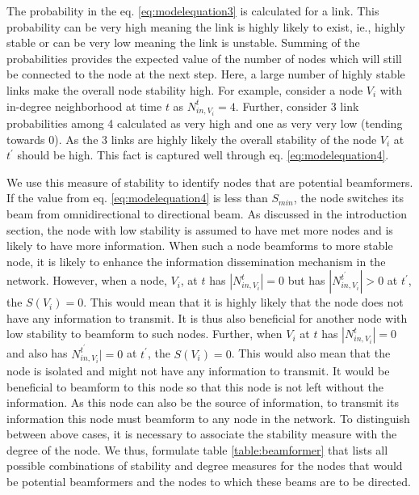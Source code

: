 \documentclass[preprint, twocolumn,5p]{elsarticle}
\begin{document}
The probability in the eq. \ref{eq:modelequation3} is calculated for a link. This probability can be very high meaning the link is highly likely to exist, ie., highly stable or can be very low meaning the link is unstable. Summing of the probabilities provides the expected value of the number of nodes which will still be connected to the node at the next step. Here, a large number of highly stable links make the overall node stability high. For example, consider a node $V_{i}$ with in-degree neighborhood at time $t$ as $N_{in,V_{i}}^{t}=4$. Further, consider 3 link probabilities among 4 calculated as very high and one as very very low (tending towards 0). As the 3 links are highly likely the overall stability of the node $V_{i}$ at $t^{'}$ should be high. This fact is captured well through eq. \ref{eq:modelequation4}.

We use this measure of stability to identify nodes that are potential beamformers. If the value from eq. \ref{eq:modelequation4} is less than $S_{min}$, the node switches its beam from omnidirectional to directional beam. As discussed in the introduction section, the node with low stability is assumed to have met more nodes and is likely to have more information. When such a node beamforms to more stable node, it is likely to enhance the information dissemination mechanism in the network. However, when a node, $V_{i}$, at $t$ has $|N_{in,V_{i}}^{t}|=0$ but has $|N_{in,V_{i}}^{t^{'}}|>0$ at $t^{'}$, the $S(V_{i})=0$. This would mean that it is highly likely that the node does not have any information to transmit. It is thus also beneficial for another node with low stability to beamform to such nodes. Further, when $V_{i}$ at $t$ has $|N_{in,V_{i}}^{t}|=0$ and also has $N_{in,V_{i}}^{t^{'}}|=0$ at $t^{'}$, the $S(V_{i})=0$. This would also mean that the node is isolated and might not have any information to transmit. It would be beneficial to beamform to this node so that this node is not left without the information. As this node can also be the source of information, to transmit its information this node must beamform to any node in the network. To distinguish between above cases, it is necessary to associate the stability measure with the degree of the node. We thus, formulate table \ref{table:beamformer} that lists all possible combinations of stability and degree measures for the nodes that would be potential beamformers and the nodes to which these beams are to be directed.
\end{document}
